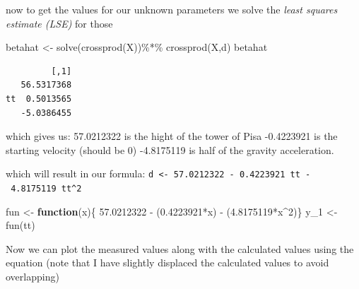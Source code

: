 \documentclass[
  letterpaper,
  DIV=11,
  numbers=noendperiod]{scrartcl}
\newenvironment{Shaded}{\begin{snugshade}}{\end{snugshade}}
\newcommand{\ControlFlowTok}[1]{\textcolor[rgb]{0.00,0.23,0.31}{\textbf{#1}}}
\newcommand{\DecValTok}[1]{\textcolor[rgb]{0.68,0.00,0.00}{#1}}
\newcommand{\FloatTok}[1]{\textcolor[rgb]{0.68,0.00,0.00}{#1}}
\newcommand{\FunctionTok}[1]{\textcolor[rgb]{0.28,0.35,0.67}{#1}}
\newcommand{\NormalTok}[1]{\textcolor[rgb]{0.00,0.23,0.31}{#1}}
\newcommand{\OtherTok}[1]{\textcolor[rgb]{0.00,0.23,0.31}{#1}}
\newcommand{\SpecialCharTok}[1]{\textcolor[rgb]{0.37,0.37,0.37}{#1}}
\begin{document}
now to get the values for our unknown parameters we solve the
\emph{least squares estimate (LSE)} for those

\begin{Shaded}
\begin{Highlighting}[]
\NormalTok{betahat }\OtherTok{\textless{}{-}} \FunctionTok{solve}\NormalTok{(}\FunctionTok{crossprod}\NormalTok{(X))}\SpecialCharTok{\%*\%} \FunctionTok{crossprod}\NormalTok{(X,d)}
\NormalTok{betahat}
\end{Highlighting}
\end{Shaded}

\begin{verbatim}
         [,1]
   56.5317368
tt  0.5013565
   -5.0386455
\end{verbatim}

which gives us: 57.0212322 is the hight of the tower of Pisa -0.4223921
is the starting velocity (should be 0) -4.8175119 is half of the gravity
acceleration.

which will result in our formula:
\texttt{d\ \textless{}-\ 57.0212322\ -\ 0.4223921\ tt\ -\ 4.8175119\ tt\^{}2}

\begin{Shaded}
\begin{Highlighting}[]
\NormalTok{fun }\OtherTok{\textless{}{-}} \ControlFlowTok{function}\NormalTok{(x)\{}
  \FloatTok{57.0212322} \SpecialCharTok{{-}}\NormalTok{ (}\FloatTok{0.4223921}\SpecialCharTok{*}\NormalTok{x) }\SpecialCharTok{{-}}\NormalTok{ (}\FloatTok{4.8175119}\SpecialCharTok{*}\NormalTok{x}\SpecialCharTok{\^{}}\DecValTok{2}\NormalTok{)\}}
\NormalTok{y\_1 }\OtherTok{\textless{}{-}} \FunctionTok{fun}\NormalTok{(tt)}
\end{Highlighting}
\end{Shaded}

Now we can plot the measured values along with the calculated values
using the equation (note that I have slightly displaced the calculated
values to avoid overlapping)
\end{document}

